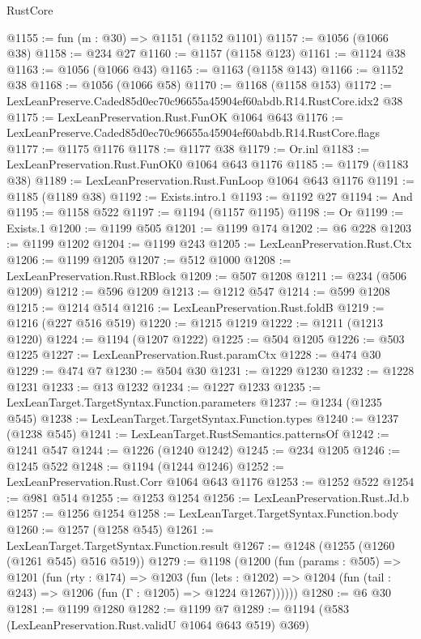 \begin{lexlean}{RustCore}
\begin{coremodule}
@1155 := fun (m : @30) => @1151 (@1152 @1101)
@1157 := @1056 (@1066 @38)
@1158 := @234 @27
@1160 := @1157 (@1158 @123)
@1161 := @1124 @38
@1163 := @1056 (@1066 @43)
@1165 := @1163 (@1158 @143)
@1166 := @1152 @38
@1168 := @1056 (@1066 @58)
@1170 := @1168 (@1158 @153)
@1172 := LexLeanPreserve.Caded85d0ec70c96655a45904ef60abdb.R14.RustCore.idx2 @38
@1175 := LexLeanPreservation.Rust.FunOK @1064 @643
@1176 := LexLeanPreserve.Caded85d0ec70c96655a45904ef60abdb.R14.RustCore.flags
@1177 := @1175 @1176
@1178 := @1177 @38
@1179 := Or.inl
@1183 := LexLeanPreservation.Rust.FunOK0 @1064 @643 @1176
@1185 := @1179 (@1183 @38)
@1189 := LexLeanPreservation.Rust.FunLoop @1064 @643 @1176
@1191 := @1185 (@1189 @38)
@1192 := Exists.intro.{1}
@1193 := @1192 @27
@1194 := And
@1195 := @1158 @522
@1197 := @1194 (@1157 @1195)
@1198 := Or
@1199 := Exists.{1}
@1200 := @1199 @505
@1201 := @1199 @174
@1202 := @6 @228
@1203 := @1199 @1202
@1204 := @1199 @243
@1205 := LexLeanPreservation.Rust.Ctx
@1206 := @1199 @1205
@1207 := @512 @1000
@1208 := LexLeanPreservation.Rust.RBlock
@1209 := @507 @1208
@1211 := @234 (@506 @1209)
@1212 := @596 @1209
@1213 := @1212 @547
@1214 := @599 @1208
@1215 := @1214 @514
@1216 := LexLeanPreservation.Rust.foldB
@1219 := @1216 (@227 @516 @519)
@1220 := @1215 @1219
@1222 := @1211 (@1213 @1220)
@1224 := @1194 (@1207 @1222)
@1225 := @504 @1205
@1226 := @503 @1225
@1227 := LexLeanPreservation.Rust.paramCtx
@1228 := @474 @30
@1229 := @474 @7
@1230 := @504 @30
@1231 := @1229 @1230
@1232 := @1228 @1231
@1233 := @13 @1232
@1234 := @1227 @1233
@1235 := LexLeanTarget.TargetSyntax.Function.parameters
@1237 := @1234 (@1235 @545)
@1238 := LexLeanTarget.TargetSyntax.Function.types
@1240 := @1237 (@1238 @545)
@1241 := LexLeanTarget.RustSemantics.patternsOf
@1242 := @1241 @547
@1244 := @1226 (@1240 @1242)
@1245 := @234 @1205
@1246 := @1245 @522
@1248 := @1194 (@1244 @1246)
@1252 := LexLeanPreservation.Rust.Corr @1064 @643 @1176
@1253 := @1252 @522
@1254 := @981 @514
@1255 := @1253 @1254
@1256 := LexLeanPreservation.Rust.Jd.b
@1257 := @1256 @1254
@1258 := LexLeanTarget.TargetSyntax.Function.body
@1260 := @1257 (@1258 @545)
@1261 := LexLeanTarget.TargetSyntax.Function.result
@1267 := @1248 (@1255 (@1260 (@1261 @545) @516 @519))
@1279 := @1198
    (@1200
      (fun (params : @505) =>
      @1201
        (fun (rty : @174) =>
        @1203
          (fun (lets : @1202) =>
          @1204 (fun (tail : @243) => @1206 (fun (Γ : @1205) => @1224 @1267))))))
@1280 := @6 @30
@1281 := @1199 @1280
@1282 := @1199 @7
@1289 := @1194 (@583 (LexLeanPreservation.Rust.validU @1064 @643 @519) @369)

\end{coremodule}
\end{lexlean}
